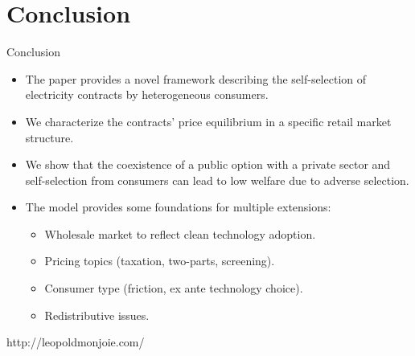 \documentclass{class}
\begin{document}


\section{Conclusion}



\begin{frame}{Conclusion}

\begin{itemize}
    \item The paper provides a novel framework describing the self-selection of electricity contracts by heterogeneous consumers.\vfill
    \item We characterize the contracts' price equilibrium in a specific retail market structure.\vfill
    \item We show that the coexistence of a public option with a private sector and self-selection from consumers can lead to low welfare due to adverse selection.\vfill
    \item The model provides some foundations for multiple extensions:
    \begin{itemize}
        \item Wholesale market to reflect clean technology adoption.
        \item Pricing topics (taxation, two-parts, screening).
        \item Consumer type (friction, ex ante technology choice).
        \item Redistributive issues.
    \end{itemize}
\end{itemize}
    
\end{frame}







\begin{frame}{}
  
  \vspace{1cm}

  http://leopoldmonjoie.com/
\end{frame}
\end{document}
